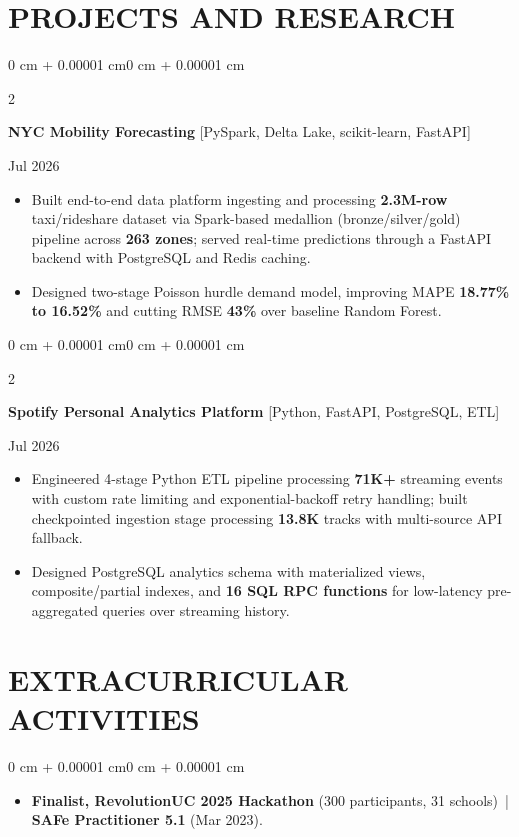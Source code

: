 \documentclass[10pt, letterpaper]{article}
\newenvironment{highlights}{
    \begin{itemize}[
        topsep=0.10 cm,
        parsep=0.06 cm,
        partopsep=0pt,
        itemsep=0.06 cm,
        leftmargin=12pt
    ]
}{
    \end{itemize}
}
\newenvironment{onecolentry}{
    \begin{adjustwidth}{0 cm + 0.00001 cm}{0 cm + 0.00001 cm}
}{
    \end{adjustwidth}
}
\newenvironment{twocolentry}[2][]{
    \onecolentry
    \def\secondColumn{#2}
    \setcolumnwidth{\fill, 4.5 cm}
    \begin{paracol}{2}
}{
    \switchcolumn \raggedleft \secondColumn
    \end{paracol}
    \endonecolentry
}
\begin{document}
\section{PROJECTS AND RESEARCH}
\begin{twocolentry}{Jul 2026}
\textbf{NYC Mobility Forecasting} [PySpark, Delta Lake, scikit-learn, FastAPI]
\end{twocolentry}
\begin{highlights}
  \item Built end-to-end data platform ingesting and processing \textbf{2.3M-row} taxi/rideshare dataset via Spark-based medallion (bronze/silver/gold) pipeline across \textbf{263 zones}; served real-time predictions through a FastAPI backend with PostgreSQL and Redis caching.
  \item Designed two-stage Poisson hurdle demand model, improving MAPE \textbf{18.77\% to 16.52\%} and cutting RMSE \textbf{43\%} over baseline Random Forest.
\end{highlights}

\vspace{0.12 cm}

\begin{twocolentry}{Jul 2026}
\textbf{Spotify Personal Analytics Platform} [Python, FastAPI, PostgreSQL, ETL]
\end{twocolentry}
\begin{highlights}
  \item Engineered 4-stage Python ETL pipeline processing \textbf{71K+} streaming events with custom rate limiting and exponential-backoff retry handling; built checkpointed ingestion stage processing \textbf{13.8K} tracks with multi-source API fallback.
  \item Designed PostgreSQL analytics schema with materialized views, composite/partial indexes, and \textbf{16 SQL RPC functions} for low-latency pre-aggregated queries over streaming history.
\end{highlights}

\section{EXTRACURRICULAR ACTIVITIES}
\begin{onecolentry}
\begin{highlights}
  \item \textbf{Finalist, RevolutionUC 2025 Hackathon} (300 participants, 31 schools) \,|\, \textbf{SAFe Practitioner 5.1} (Mar 2023).
\end{highlights}
\end{onecolentry}
\end{document}

